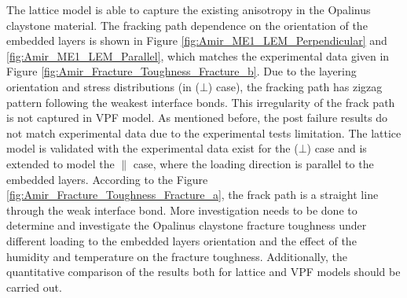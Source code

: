 The lattice model is able to capture the existing anisotropy in the Opalinus claystone material. The fracking path dependence on the orientation of the embedded layers is shown in Figure \ref{fig:Amir_ME1_LEM_Perpendicular} and \ref{fig:Amir_ME1_LEM_Parallel}, which matches the experimental data given in Figure \ref{fig:Amir_Fracture_Toughness_Fracture_b}. Due to the layering orientation and stress distributions (in ($\bot$) case), the fracking path has zigzag pattern following the weakest interface bonds. This irregularity of the frack path is not captured in VPF model. As mentioned before, the post failure results do not match experimental data due to the experimental tests limitation. The lattice model is validated with the experimental data exist for the ($\bot$) case and is extended to model the $\parallel$ case, where the loading direction is parallel to the embedded layers. According to the Figure \ref{fig:Amir_Fracture_Toughness_Fracture_a}, the frack path is a straight line through the weak interface bond. More investigation needs to be done to determine and investigate the Opalinus claystone fracture toughness under different loading to the embedded layers orientation and the effect of the humidity and temperature on the fracture toughness. Additionally, the quantitative comparison of the results both for lattice and VPF models should be carried out.


